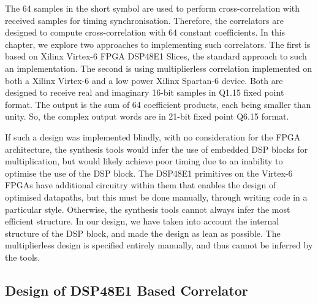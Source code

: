 The 64 samples in the short symbol are used to perform cross-correlation with received samples for timing synchronisation. 
Therefore, the correlators are designed to compute cross-correlation with 64 constant coefficients. 
In this chapter, we explore two approaches to implementing such correlators. 
The first is based on Xilinx Virtex-6 FPGA DSP48E1 Slices, the standard approach to such an implementation.
The second is using multiplierless correlation implemented on both a Xilinx Virtex-6 and a low power Xilinx Spartan-6 device.
Both are designed to receive real and imaginary 16-bit samples in Q1.15 fixed point format. 
The output is the sum of 64 coefficient products, each being smaller than unity. 
So, the complex output words are in 21-bit fixed point Q6.15 format. 

If such a design was implemented blindly, with no consideration for the FPGA architecture, the synthesis tools would infer the use of embedded DSP blocks for multiplication, but would likely achieve poor timing due to an inability to optimise the use of the DSP block.
The DSP48E1 primitives on the Virtex-6 FPGAs have additional circuitry within them that enables the design of optimised datapaths, but this must be done manually, through writing code in a particular style.
Otherwise, the synthesis tools cannot always infer the most efficient structure.
In our design, we have taken into account the internal structure of the DSP block, and made the design as lean as possible.
The multiplierless design is specified entirely manually, and thus cannot be inferred by the tools.

\subsection{Design of DSP48E1 Based Correlator}


